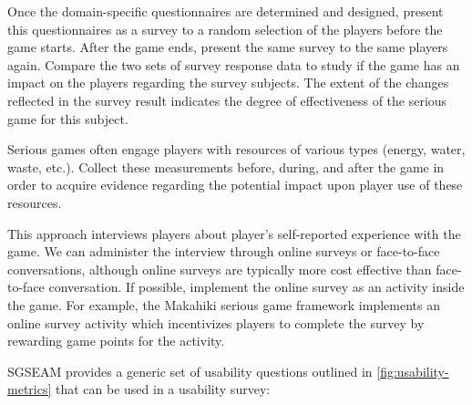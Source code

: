 Once the domain-specific questionnaires are determined and designed, present this questionnaires as a 
survey to a random selection of the players before the game starts. After the game ends, present the same 
survey to the same players again. Compare the two sets of survey response data to study if the game has an 
impact on the players regarding the survey subjects. The extent of the changes reflected in the survey 
result indicates the degree of effectiveness of the serious game for this subject.

Serious games often engage players with resources of various types (energy, water, waste, etc.). Collect 
these measurements before, during, and after the game in order to acquire evidence regarding the potential 
impact upon player use of these resources.

\label{Self-reported usability survey}

This approach interviews players about player's self-reported experience with the game. We can administer the interview through online surveys or face-to-face conversations, although online surveys are typically more 
cost effective than face-to-face conversation. If possible, implement the online survey as an activity inside the 
game. For example, the Makahiki serious game framework implements an online survey activity which 
incentivizes players to complete the survey by rewarding game points for the activity.

SGSEAM provides a generic set of usability questions outlined in \autoref{fig:usability-metrics} that can be used in a usability survey:\\

